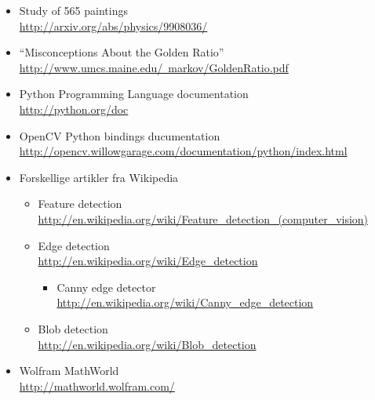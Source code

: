 \begin{itemize}
	\item Study of 565 paintings\\
		\href{http://arxiv.org/abs/physics/9908036/}{http://arxiv.org/abs/physics/9908036/}
	\item ``Misconceptions About the Golden Ratio''\\
		\href{http://www.umcs.maine.edu/~markov/GoldenRatio.pdf}{http://www.umcs.maine.edu/~markov/GoldenRatio.pdf}
	\item Python Programming Language documentation\\
		\href{http://python.org/doc}{http://python.org/doc}
	\item OpenCV Python bindings ducumentation\\
		\href{http://opencv.willowgarage.com/documentation/python/index.html}{http://opencv.willowgarage.com/documentation/python/index.html}
	\item Forskellige artikler fra Wikipedia\\
		\begin{itemize}
			\item Feature detection\\
				\href{http://en.wikipedia.org/wiki/Feature\_detection\_(computer\_vision)}{http://en.wikipedia.org/wiki/Feature\_detection\_(computer\_vision)}\\
			\item Edge detection\\
				\href{http://en.wikipedia.org/wiki/Edge\_detection}{http://en.wikipedia.org/wiki/Edge\_detection}
					\begin{itemize}
						\item Canny edge detector\\
							\href{http://en.wikipedia.org/wiki/Canny\_edge\_detection}{http://en.wikipedia.org/wiki/Canny\_edge\_detection}
					\end{itemize}
			\item Blob detection\\
				\href{http://en.wikipedia.org/wiki/Blob\_detection}{http://en.wikipedia.org/wiki/Blob\_detection}
		\end{itemize}
	\item Wolfram MathWorld\\
		\href{http://mathworld.wolfram.com/}{http://mathworld.wolfram.com/}
\end{itemize}
